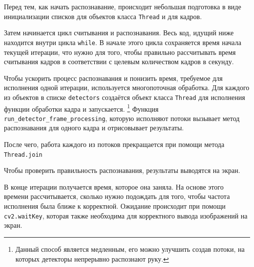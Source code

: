 \documentclass[14pt, a4paper]{extarticle}
\begin{document}
Перед тем, как начать распознавание, происходит небольшая подготовка в виде
инициализации списков для объектов класса \texttt{Thread} и для кадров.

Затем начинается цикл считывания и распознавания. Весь код, идущий ниже
находится внутри цикла \texttt{while}. В начале этого цикла сохраняется время
начала текущей итерации, что нужно для того, чтобы правильно рассчитывать время
считывания кадров в соответствии с целевым количеством кадров в секунду.

Чтобы ускорить процесс распознавания и понизить время, требуемое для исполнения
одной итерации, используется многопоточная обработка. Для каждого из объектов в
списке \texttt{detectors} создаётся объект класса \texttt{Thread} для
исполнения функции обработки кадра и запускается.
\footnote{Данный способ является медленным, его можно улучшить создав потоки, на
которых детекторы непрерывно распознают руку.}
Функция \texttt{run\_detector\_frame\_processing}, которую исполняют потоки
вызывает метод распознавания для одного кадра и отрисовывает результаты.

После чего, работа каждого из потоков прекращается при помощи метода \texttt{Thread.join}

Чтобы проверить правильность распознавания, результаты выводятся на экран.

В конце итерации получается время, которое она заняла. На основе этого времени
рассчитывается, сколько нужно подождать для того, чтобы частота исполнения была
ближе к корректной. Ожидание происходит при помощи \texttt{cv2.waitKey},
которая также необходима для корректного вывода изображений на экран.
\end{document}
